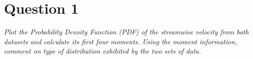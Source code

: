 \section*{Question 1}
\textit{Plot the Probability Density Function (PDF) of the streamwise velocity from both datasets and calculate its first four moments. Using the moment information, comment on type of distribution exhibited by the two sets of data.}